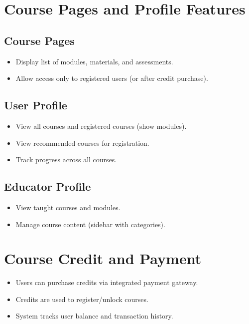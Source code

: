 \documentclass[a4paper, 11pt]{scrreprt}
\begin{document}
\section{Course Pages and Profile Features}

\subsection{Course Pages}
\begin{itemize}
    \item Display list of modules, materials, and assessments.
    \item Allow access only to registered users (or after credit purchase).
\end{itemize}

\subsection{User Profile}
\begin{itemize}
    \item View all courses and registered courses (show modules).
    \item View recommended courses for registration.
    \item Track progress across all courses.
\end{itemize}

\subsection{Educator Profile}
\begin{itemize}
    \item View taught courses and modules.
    \item Manage course content (sidebar with categories).
\end{itemize}

\section{Course Credit and Payment}

\begin{itemize}
    \item Users can purchase credits via integrated payment gateway.
    \item Credits are used to register/unlock courses.
    \item System tracks user balance and transaction history.
\end{itemize}
\end{document}
